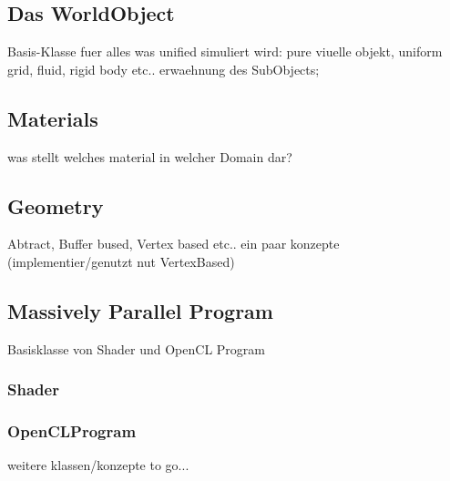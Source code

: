 \subsection{Das WorldObject}
	Basis-Klasse fuer alles was unified simuliert wird: pure viuelle objekt, uniform grid, fluid, rigid body etc..
	erwaehnung des SubObjects;  
 
\subsection{Materials}  
	was stellt welches material in welcher Domain dar?
	
\subsection{Geometry}
	Abtract, Buffer bused, Vertex based etc.. ein paar konzepte (implementier/genutzt nut VertexBased)  
	
\subsection{Massively Parallel Program}
	Basisklasse von Shader und OpenCL Program
	\subsubsection{Shader}
		
	\subsubsection{OpenCLProgram}

weitere klassen/konzepte to go...	
	  	
  	

\clearpage
